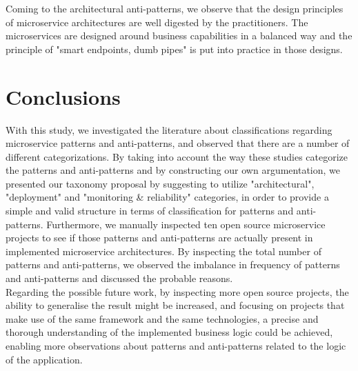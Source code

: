 \documentclass[11pt,a4paper,twocolumn]{article}
\begin{document}
Coming to the architectural anti-patterns, we observe that the design principles of microservice architectures are well digested by the practitioners.
The microservices are designed around business capabilities in a balanced way and the principle of "smart endpoints, dumb pipes" is put into practice in those designs.
\section{Conclusions}

With this study, we investigated the literature about classifications regarding microservice patterns and anti-patterns, and observed that there are a number of different categorizations.
By taking into account the way these studies categorize the patterns and anti-patterns and by constructing our own argumentation, we presented our taxonomy proposal by suggesting to utilize "architectural", "deployment" and "monitoring \& reliability" categories, in order to provide a simple and valid structure in terms of classification for patterns and anti-patterns.
Furthermore, we manually inspected ten open source microservice projects to see if those patterns and anti-patterns are actually present in implemented microservice architectures.
By inspecting the total number of patterns and anti-patterns, we observed the imbalance in frequency of patterns and anti-patterns and discussed the probable reasons.
\\
Regarding the possible future work, by inspecting more open source projects, the ability to generalise the result might be increased, and focusing on projects that make use of the same framework and the same technologies, a precise and thorough understanding of the implemented business logic could be achieved, enabling more observations about patterns and anti-patterns related to the logic of the application.

\end{document}
